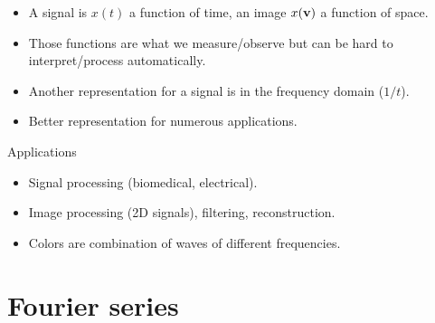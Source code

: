 

  \begin{itemize}
    \item A signal is $x(t)$ a function of time, an image $x(\mathbf{v})$ a function of space.
    \item Those functions are what we measure/observe  but can be hard to
    interpret/process automatically.
    \item Another representation for a signal is in the frequency domain ($1/t$).
    \item Better representation for numerous applications.
  \end{itemize}


  \begin{exampleblock}{Applications}
    \begin{itemize}
      \item Signal processing (biomedical, electrical).
      \item Image processing (2D signals), filtering, reconstruction.
      \item Colors are combination of waves of different frequencies.
    \end{itemize}
  \end{exampleblock}
  
\section{Fourier series}
\label{sec:fourier-transform}



